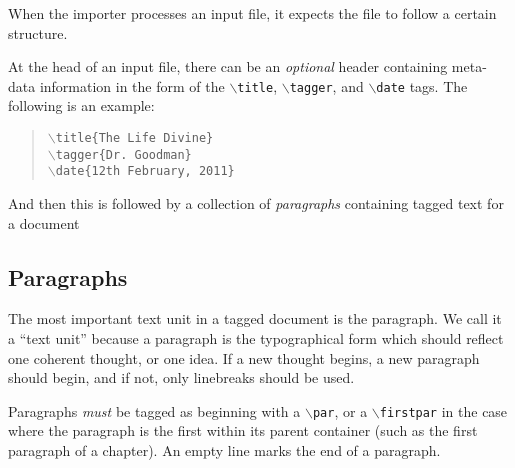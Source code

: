 \documentclass[11pt]{article}
\newcommand{\cmd}[1]{{\tt $\backslash$#1}}
\begin{document}
When the importer processes an input file, it expects the file to
follow a certain structure.

At the head of an input file, there can be an \emph{optional} header
containing meta-data information in the form of the \cmd{title},
\cmd{tagger}, and \cmd{date} tags. The following is an example:

\begin{quote}
  \cmd{title\{The Life Divine\}}\\
  \cmd{tagger\{Dr. Goodman\}}\\
  \cmd{date\{12th February, 2011\}}
\end{quote}

\noindent And then this is followed by a collection of \emph{paragraphs}
containing tagged text for a document



\subsection{Paragraphs}




The most important text unit in a tagged document is the paragraph. We
call it a ``text unit'' because a paragraph is the typographical form
which should reflect one coherent thought, or one idea. If a new
thought begins, a new paragraph should begin, and if not, only
linebreaks should be used.

Paragraphs \emph{must} be tagged as beginning with a \cmd{par}, or a
\cmd{firstpar} in the case where the paragraph is the first within its
parent container (such as the first paragraph of a chapter). An empty
line marks the end of a paragraph.
\end{document}
